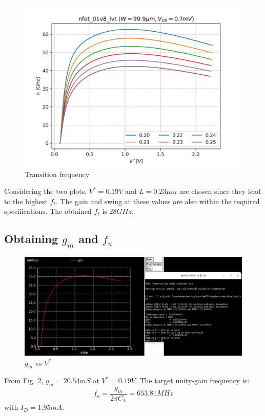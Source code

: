 \documentclass[conference]{IEEEtran}
\begin{document}
\begin{figure}[H]
	\centering 
	\includegraphics[width=\columnwidth]{vstar-ft-maxft.png}
	\caption{Transition frequency}
	\label{vstar-ft-2}	
\end{figure}
Considering the two plots, $V^*=0.19V$ and $L=0.23\mu m$ are chosen since they lead to the highest $f_t$. The gain and swing at these values are also within the required specifications. The obtained $f_t$ is $28GHz$.
\subsection{Obtaining $g_m$ and $f_u$}
\begin{figure}[H]
	\centering 
	\includegraphics[width=\columnwidth]{gm-vstar.png}
	\caption{$g_m$ vs $V^*$}
	\label{gm-vstar}	
\end{figure}
From Fig. \ref{gm-vstar}, $g_m=20.54mS$ at $V^*=0.19V$. The target unity-gain frequency is:
\begin{equation*}
	f_u = \frac{g_m}{2\pi C_L} = 653.81MHz
\end{equation*}
with $I_D=1.95mA$. 
\end{document}

